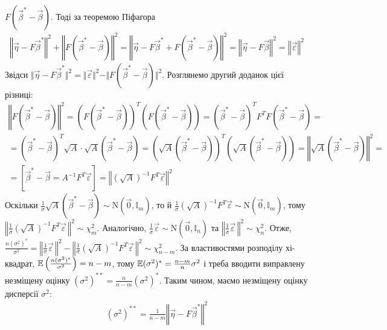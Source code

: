 $F(\vec{\beta}^* - \vec{\beta})$. Тоді за теоремою Піфагора
\begin{gather*}
    \left\Vert \vec{\eta} - F \vec{\beta}^* \right\Vert^2 + \left\Vert F(\vec{\beta}^* - \vec{\beta}) \right\Vert^2 = 
    \left\Vert \vec{\eta} - F \vec{\beta}^* + F(\vec{\beta}^* - \vec{\beta})\right\Vert^2 = 
    \left\Vert \vec{\eta} - F \vec{\beta}\right\Vert^2 = \left\Vert \vec{\varepsilon}\right\Vert^2
\end{gather*}
Звідси $\Vert \vec{\eta} - F \vec{\beta}^* \Vert^2 = \Vert \vec{\varepsilon}\Vert^2 - \Vert F(\vec{\beta}^* - \vec{\beta}) \Vert^2$.
Розглянемо другий доданок цієї різниці:
\begin{gather*}
    \left\Vert F(\vec{\beta}^* - \vec{\beta}) \right\Vert^2  = \left(F(\vec{\beta}^* - \vec{\beta})\right)^T \left(F(\vec{\beta}^* - \vec{\beta})\right) = 
    (\vec{\beta}^* - \vec{\beta})^T F^T F (\vec{\beta}^* - \vec{\beta}) = \\ = 
    (\vec{\beta}^* - \vec{\beta})^T \sqrt{A} \cdot \sqrt{A} (\vec{\beta}^* - \vec{\beta}) = 
    \left(\sqrt{A}(\vec{\beta}^* - \vec{\beta})\right)^T \left(\sqrt{A}(\vec{\beta}^* - \vec{\beta})\right) =
    \left\Vert \sqrt{A}(\vec{\beta}^* - \vec{\beta}) \right\Vert^2 = \\ = 
    \left[\vec{\beta}^* - \vec{\beta} = A^{-1} F^T \vec{\varepsilon}\right] = 
    \left\Vert (\sqrt{A})^{-1} F^T \vec{\varepsilon} \right\Vert^2
\end{gather*}
Оскільки $\frac{1}{\sigma} \sqrt{A}(\vec{\beta}^* - \vec{\beta}) \sim \mathrm{N}(\vec{0}, \mathbb{I}_m)$, то й
$\frac{1}{\sigma}(\sqrt{A})^{-1} F^T \vec{\varepsilon} \sim \mathrm{N}(\vec{0}, \mathbb{I}_m)$, тому $\left\Vert \frac{1}{\sigma} (\sqrt{A})^{-1} F^T \vec{\varepsilon}\, \right\Vert^2 \sim \chi^2_m$.
Аналогічно, $\frac{1}{\sigma} \vec{\varepsilon} \sim \mathrm{N}(\vec{0}, \mathbb{I}_n)$ та 
$\left\Vert\frac{1}{\sigma} \vec{\varepsilon}\,\right\Vert^2 \sim \chi^2_n$.
Отже, $\frac{n (\sigma^2)^*}{\sigma^2} = \left\Vert\frac{1}{\sigma} \vec{\varepsilon}\,\right\Vert^2 - \left\Vert \frac{1}{\sigma} (\sqrt{A})^{-1} F^T \vec{\varepsilon}\, \right\Vert^2 \sim \chi^2_{n-m}$.
За властивостями розподілу хі-квадрат, $\mathbb{E}\left(\frac{n (\sigma^2)^*}{\sigma^2}\right) = n-m$, тому $\mathbb{E}(\sigma^2)^* = \frac{n-m}{n} \sigma^2$ і треба вводити виправлену незміщену оцінку 
$(\sigma^2)^{**} = \frac{n}{n-m}(\sigma^2)^*$. Таким чином, маємо незміщену оцінку дисперсії $\sigma^2$:
\begin{gather}
    (\sigma^2)^{**} = \frac{1}{n-m} \left\Vert \vec{\eta} - F \vec{\beta}^* \right\Vert^2
\end{gather}

